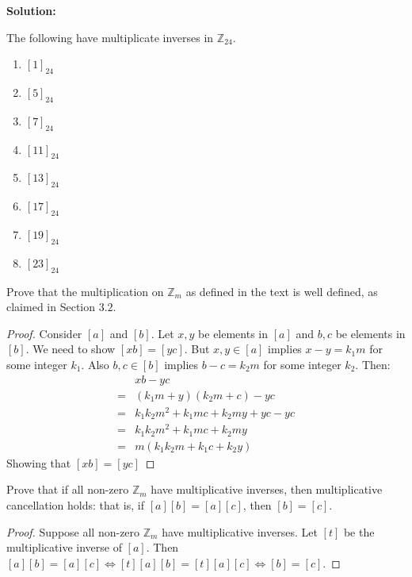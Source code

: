 \documentclass[8pt]{article}
\begin{document}
\textbf{Solution:}

The following have multiplicate inverses in $\mathbb{Z}_{24}$.

\begin{enumerate}
    \item $[1]_{24}$
    \item $[5]_{24}$
    \item $[7]_{24}$
    \item $[11]_{24}$
    \item $[13]_{24}$
    \item $[17]_{24}$
    \item $[19]_{24}$
    \item $[23]_{24}$
\end{enumerate}

\begin{tcolorbox}[title=Problem 9, breakable]
    Prove that the multiplication on $\mathbb{Z}_m$ as defined in the text 
    is well defined, as claimed in Section $3.2$.
\end{tcolorbox}

\begin{proof}
    Consider $[a]$ and $[b]$.
    Let $x, y$ be elements in $[a]$ and $b, c$ be elements in $[b]$.
    We need to show $[xb] = [yc]$.
    But $x,y \in [a]$ implies $x - y = k_1 m$ for some integer $k_1$.
    Also $b, c \in [b]$ implies $b - c = k_2 m$ for some integer $k_2$.
    Then:
    \begin{align*}
        &xb - yc  \\
        =&(k_1 m + y)(k_2 m + c) - yc  \\
        =&k_1 k_2 m^2 + k_1 mc + k_2 my + yc - yc  \\
        =&k_1 k_2 m^2 + k_1 mc + k_2 my  \\
        =&m(k_1 k_2 m + k_1 c + k_2 y)
    \end{align*}
    Showing that $[xb]=[yc]$
\end{proof}

\begin{tcolorbox}[title=Problem 10, breakable]
    Prove that if all non-zero $\mathbb{Z}_m$ have multiplicative inverses,
    then multiplicative cancellation holds: that is, if $[a][b] = [a][c]$, 
    then $[b] = [c]$.
\end{tcolorbox}

\begin{proof}
    Suppose all non-zero $\mathbb{Z}_m$ have multiplicative inverses.
    Let $[t]$ be the multiplicative inverse of $[a]$.
    Then $[a][b] = [a][c] \iff [t][a][b] = [t][a][c] \iff [b] = [c]$.
\end{proof}
\end{document}
